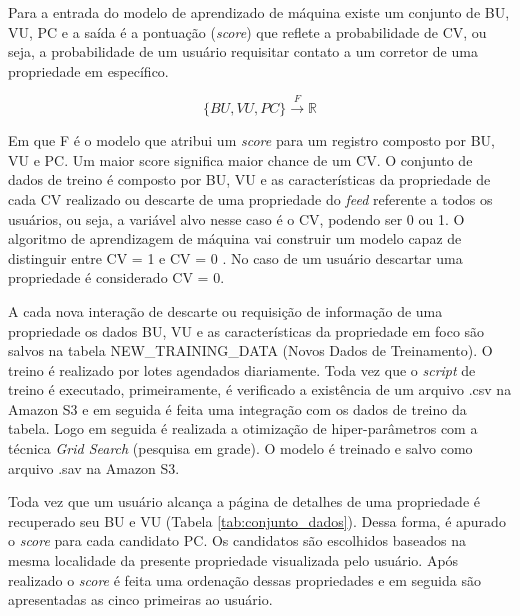     Para a entrada do modelo de aprendizado de máquina existe um conjunto de {BU, VU, PC} e a saída é a pontuação (\textit{score}) que reflete a probabilidade de CV, ou seja, a probabilidade de um usuário requisitar contato a um corretor de uma propriedade em específico.

\begin{equation}
    \{BU,VU,PC\}  \xrightarrow{F} \mathbb{R}
\end{equation}

Em que F é o modelo que atribui um \textit{score} para um registro composto por BU, VU e PC. Um maior score significa maior chance de um CV. O conjunto de dados de treino é composto por BU, VU e as características da propriedade de cada CV realizado ou descarte de uma propriedade do \textit{feed} referente a todos os usuários, ou seja, a variável alvo nesse caso é o CV, podendo ser 0 ou 1. O algoritmo de aprendizagem de máquina vai construir um modelo capaz de distinguir entre CV = 1 e CV = 0 . No caso de um usuário descartar uma propriedade é considerado CV = 0.

A cada nova interação de descarte ou requisição de informação de uma propriedade os dados BU, VU e as características da propriedade em foco são salvos na tabela NEW\_TRAINING\_DATA (Novos Dados de Treinamento). O treino é realizado por lotes agendados diariamente. Toda vez que o \textit{script} de treino é executado, primeiramente, é verificado a existência de um arquivo .csv na Amazon S3 e em seguida é feita uma integração com os dados de treino da tabela. Logo em seguida é realizada a otimização de hiper-parâmetros com a técnica \textit{Grid Search} (pesquisa em grade). O modelo é treinado e salvo como arquivo .sav na Amazon S3.

Toda vez que um usuário alcança a página de detalhes de uma propriedade é recuperado seu BU e VU (Tabela \ref{tab:conjunto_dados}). Dessa forma, é apurado o \textit{score} para cada candidato PC. Os candidatos são escolhidos baseados na mesma localidade da presente propriedade visualizada pelo usuário. Após realizado o \textit{score} é feita uma ordenação dessas propriedades e em seguida são apresentadas as cinco primeiras ao usuário.

